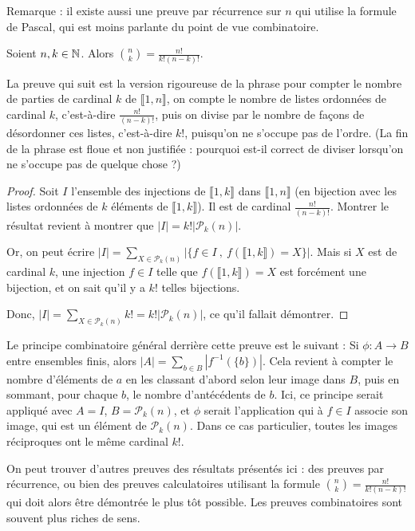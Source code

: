 Remarque : il existe aussi une preuve par récurrence sur $n$ qui utilise la formule de Pascal, qui est moins parlante du point de vue combinatoire.

\begin{proposition}Soient $n, k\in \mathbb{N}$. Alors $\binom{n}{k} = \frac{n!}{k!(n-k)!}$.
\end{proposition}

La preuve qui suit est la version rigoureuse de la phrase \og pour compter le nombre de parties de cardinal $k$ de $\llbracket 1,n\rrbracket$, on compte le nombre de  listes ordonnées de cardinal $k$, c'est-à-dire $\frac{n!}{(n-k)!}$, puis on divise par le nombre de façons de désordonner ces listes, c'est-à-dire $k!$, puisqu'on ne s'occupe pas de l'ordre\fg. (La fin de la phrase est floue et non justifiée : pourquoi est-il correct de \og diviser\fg{} lorsqu'on ne \og s'occupe pas\fg{} de quelque chose ?)

\begin{proof} 

Soit $I$ l'ensemble des injections de $\llbracket 1,k\rrbracket$ dans $\llbracket 1,n\rrbracket$ (en bijection avec les listes ordonnées de $k$ éléments de $\llbracket 1,k\rrbracket$). Il est de cardinal $\frac{n!}{(n-k)!}$. Montrer le résultat revient à montrer que $|I| = k! |\mathcal P_k(n)|$.

Or, on peut écrire $|I| = \sum_{X\in \mathcal P_k(n)} \left| \{f\in I\:,\: f(\llbracket 1,k\rrbracket)=X\}\right|$. Mais si $X$ est de cardinal $k$, une injection $f\in I$ telle que  $f(\llbracket 1,k\rrbracket)=X$ est forcément une bijection, et on sait qu'il y a $k!$ telles bijections.

Donc, $|I| = \sum_{X\in \mathcal P_k(n)} k! = k! |\mathcal P_k(n)|$, ce qu'il fallait démontrer.
\end{proof}

\begin{remarque} Le principe combinatoire général derrière cette preuve est le suivant : Si $\phi : A\to B$ entre ensembles finis, alors $|A| = \sum_{b\in B} \left|f^{-1}(\{b\})\right|$. Cela revient à compter le nombre d'éléments de $a$ en les classant d'abord selon leur image dans $B$, puis en sommant, pour chaque $b$, le nombre d'antécédents de $b$. Ici, ce principe serait appliqué avec $A=I$, $B=\mathcal P_k(n)$, et $\phi$ serait l'application qui à $f\in I$ associe son image, qui est un élément de $\mathcal P_k(n)$. Dans ce cas particulier, toutes les images réciproques ont le même cardinal $k!$.
\end{remarque}

\begin{remarque} On peut trouver d'autres preuves des résultats présentés ici : des preuves par récurrence, ou bien des preuves calculatoires utilisant la formule $\binom{n}{k} = \frac{n!}{k!(n-k)!}$ qui doit alors être démontrée le plus tôt possible. Les preuves combinatoires sont souvent plus riches de sens.
\end{remarque}